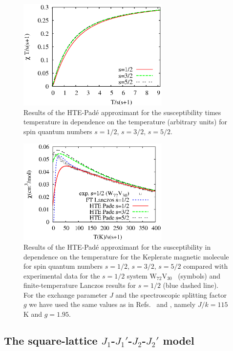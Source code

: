 \documentclass[aps,twocolumn,groupedaddress]{revtex4}
\newcommand {\wv} {$\textrm{W}_{72}\textrm{V}_{30}$}
\begin{document}
\begin{figure}[!ht]
\begin{center}
\includegraphics[clip=on,width=75mm,angle=0]{fig3.eps}
\end{center}
\caption{Results of the HTE-Pad\'e approximant for the
susceptibility times temperature in dependence on the temperature (arbitrary
units) for spin quantum numbers $s=1/2$, $s=3/2$, $s=5/2$.
}
\label{vgl_Tch_s}
\end{figure}
\begin{figure}[!ht]
\begin{center}
\includegraphics[clip=on,width=75mm,angle=0]{fig4.eps}
\end{center}
\caption{Results of the HTE-Pad\'e approximant for the
susceptibility in dependence on the temperature for the Keplerate magnetic
molecule for spin quantum numbers $s=1/2$, $s=3/2$, $s=5/2$ compared with experimental data
for the $s=1/2$ system \wv\ \cite{M_W_V30}
(symbols) and finite-temperature Lanczos results for $s=1/2$
\cite{finite_T_lanc_b} (blue dashed line).
For the exchange parameter $J$ and the spectroscopic splitting factor $g$ we
have used the same values as in Refs.~ and
, namely  $J/k=115$ K and $g=1.95$.
}
\label{vgl_ch_s}
\end{figure}

\subsection{The square-lattice $J_1$-$J_1'$-$J_2$-$J_2'$ model}
\end{document}
